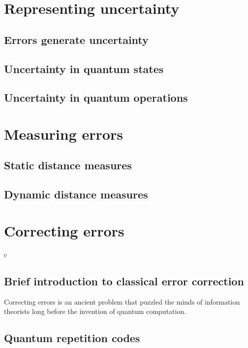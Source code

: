 \documentclass{article}
\begin{document}

\section{Representing uncertainty}

\subsection{Errors generate uncertainty}

 

\subsection{Uncertainty in quantum states}

\subsection{Uncertainty in quantum operations}

\section{Measuring errors}

\subsection{Static distance measures}

\subsection{Dynamic distance measures}

\section{Correcting errors}
c
\subsection{Brief introduction to classical error correction}

Correcting errors is an ancient problem that puzzled the minds of
information theorists long before the invention of quantum computation.

\subsection{Quantum repetition codes}
\end{document}
